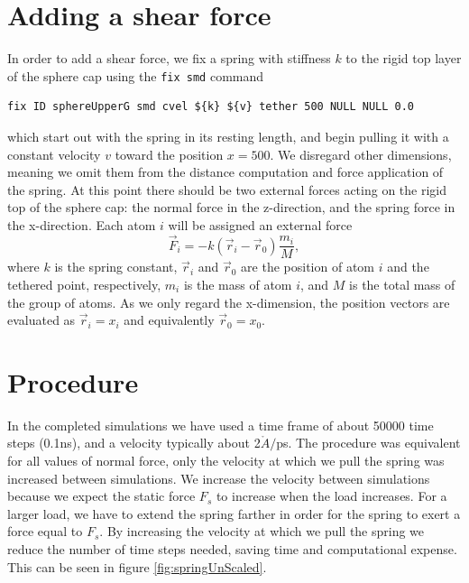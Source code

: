 \documentclass[twoside,english]{uiofysmaster}
\begin{document}
\section{Adding a shear force}
In order to add a shear force, we fix a spring with stiffness $k$ to the rigid top layer of the sphere cap using the \texttt{fix smd} command
 \begin{lstlisting}[language=LammpsInput, caption={LAMMPS command \texttt{Fix smd}, used to add a spring force to a group of atoms. The spring is considered fixed to the center of mass of the group and to a teatherd point, which we may move either with contant velocity of constant force.} ]
 fix ID sphereUpperG smd cvel ${k} ${v} tether 500 NULL NULL 0.0
 \end{lstlisting}
 which start out with the spring in its resting length, and begin pulling it with a constant velocity $v$ toward the position $x=500$. 
We disregard other dimensions, meaning we omit them from the distance computation and force application of the spring.
At this point there should be two external forces acting on the rigid top of the sphere cap: the normal force in the z-direction, and the spring force in the x-direction.
Each atom $i$ will be assigned an external force 
\begin{equation}
	\vec{F}_i = -k(\vec{r}_i- \vec{r}_0)\frac{m_i}{M},
\end{equation}
where $k$ is the spring constant, $\vec{r}_i$ and $\vec{r}_0$ are the position of atom $i$ and the tethered point, respectively, $m_i$ is the mass of atom $i$, and $M$ is the total mass of the group of atoms. 
As we only regard the x-dimension, the position vectors are evaluated as $\vec{r}_i=x_i$ and equivalently $\vec{r}_0 = x_0$.


\section{Procedure}
In the completed simulations we have used a time frame of about 50000 time steps (0.1ns), and a velocity typically about 2$\mathring{A}/$ps. 
The procedure was equivalent for all values of normal force, only the velocity at which we pull the spring was increased between simulations. 
We increase the velocity between simulations because we expect the static force $F_s$ to increase when the load increases.
For a larger load, we have to extend the spring farther in order for the spring to exert a force equal to $F_s$.
By increasing the velocity at which we pull the spring we reduce the number of time steps needed, saving time and computational expense.
This can be seen in figure \ref{fig:springUnScaled}.
\end{document}
